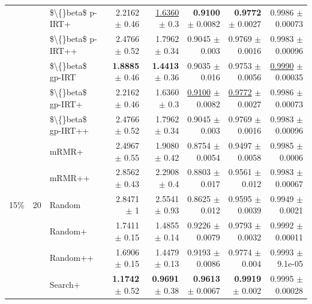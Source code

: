 \begin{longtable}{llp{}rrrrr}
 &  & \$\textbackslash\{\}beta\$ p-IRT+ & 2.2162 {\scriptsize $\pm$ 0.46} & \underline{1.6360} {\scriptsize $\pm$ 0.3} & \textbf{0.9100} {\scriptsize $\pm$ 0.0082} & \textbf{0.9772} {\scriptsize $\pm$ 0.0027} & 0.9986 {\scriptsize $\pm$ 0.00073} \\
 &  & \$\textbackslash\{\}beta\$ p-IRT++ & 2.4766 {\scriptsize $\pm$ 0.52} & 1.7962 {\scriptsize $\pm$ 0.34} & 0.9045 {\scriptsize $\pm$ 0.003} & 0.9769 {\scriptsize $\pm$ 0.0016} & 0.9983 {\scriptsize $\pm$ 0.00096} \\
 &  & \$\textbackslash\{\}beta\$ gp-IRT & \textbf{1.8885} {\scriptsize $\pm$ 0.46} & \textbf{1.4413} {\scriptsize $\pm$ 0.36} & 0.9035 {\scriptsize $\pm$ 0.016} & 0.9753 {\scriptsize $\pm$ 0.0056} & \underline{0.9990} {\scriptsize $\pm$ 0.00035} \\
 &  & \$\textbackslash\{\}beta\$ gp-IRT+ & 2.2162 {\scriptsize $\pm$ 0.46} & 1.6360 {\scriptsize $\pm$ 0.3} & \underline{0.9100} {\scriptsize $\pm$ 0.0082} & \underline{0.9772} {\scriptsize $\pm$ 0.0027} & 0.9986 {\scriptsize $\pm$ 0.00073} \\
 &  & \$\textbackslash\{\}beta\$ gp-IRT++ & 2.4766 {\scriptsize $\pm$ 0.52} & 1.7962 {\scriptsize $\pm$ 0.34} & 0.9045 {\scriptsize $\pm$ 0.003} & 0.9769 {\scriptsize $\pm$ 0.0016} & 0.9983 {\scriptsize $\pm$ 0.00096} \\
 &  & mRMR+ & 2.4967 {\scriptsize $\pm$ 0.55} & 1.9080 {\scriptsize $\pm$ 0.42} & 0.8754 {\scriptsize $\pm$ 0.0054} & 0.9497 {\scriptsize $\pm$ 0.0058} & 0.9985 {\scriptsize $\pm$ 0.0006} \\
 &  & mRMR++ & 2.8562 {\scriptsize $\pm$ 0.43} & 2.2908 {\scriptsize $\pm$ 0.4} & 0.8803 {\scriptsize $\pm$ 0.017} & 0.9561 {\scriptsize $\pm$ 0.012} & 0.9983 {\scriptsize $\pm$ 0.00067} \\
\midrule
15\% & 20 & Random & 2.8471 {\scriptsize $\pm$ 1} & 2.5541 {\scriptsize $\pm$ 0.93} & 0.8625 {\scriptsize $\pm$ 0.012} & 0.9595 {\scriptsize $\pm$ 0.0039} & 0.9949 {\scriptsize $\pm$ 0.0021} \\
 &  & Random+ & 1.7411 {\scriptsize $\pm$ 0.15} & 1.4855 {\scriptsize $\pm$ 0.14} & 0.9226 {\scriptsize $\pm$ 0.0079} & 0.9793 {\scriptsize $\pm$ 0.0032} & 0.9992 {\scriptsize $\pm$ 0.00011} \\
 &  & Random++ & 1.6906 {\scriptsize $\pm$ 0.15} & 1.4479 {\scriptsize $\pm$ 0.13} & 0.9193 {\scriptsize $\pm$ 0.0086} & 0.9774 {\scriptsize $\pm$ 0.004} & 0.9993 {\scriptsize $\pm$ 9.1e-05} \\
 &  & Search+ & \textbf{1.1742} {\scriptsize $\pm$ 0.52} & \textbf{0.9691} {\scriptsize $\pm$ 0.38} & \textbf{0.9613} {\scriptsize $\pm$ 0.0067} & \textbf{0.9919} {\scriptsize $\pm$ 0.002} & 0.9995 {\scriptsize $\pm$ 0.00028} \\

\end{longtable}
